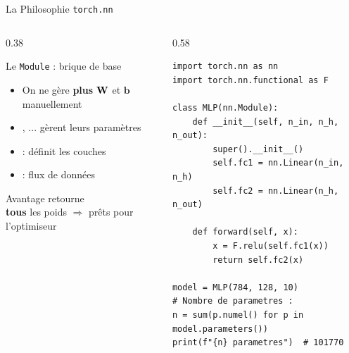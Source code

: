 \documentclass[aspectratio=169, 10pt]{beamer}
\begin{document}
\begin{frame}[fragile]{La Philosophie \texttt{torch.nn}}
  \begin{columns}[T]
    \begin{column}{0.38\textwidth}
      \begin{block}{Le \texttt{Module} : brique de base}
        \begin{itemize}\small
          \item On ne gère \textbf{plus} $\mathbf{W}$ et $\bm{b}$ manuellement
          \item {}, ... gèrent leurs paramètres
          \item {} : définit les couches
          \item {} : flux de données
        \end{itemize}
      \end{block}
      \smallskip
      \begin{exampleblock}{Avantage}
        \small{} retourne\\
        \textbf{tous} les poids $\Rightarrow$ prêts pour l'optimiseur
      \end{exampleblock}
    \end{column}
    \begin{column}{0.58\textwidth}
      \begin{lstlisting}[style=pythonstyle]
import torch.nn as nn
import torch.nn.functional as F

class MLP(nn.Module):
    def __init__(self, n_in, n_h, n_out):
        super().__init__()
        self.fc1 = nn.Linear(n_in, n_h)
        self.fc2 = nn.Linear(n_h, n_out)

    def forward(self, x):
        x = F.relu(self.fc1(x))
        return self.fc2(x)

model = MLP(784, 128, 10)
# Nombre de parametres :
n = sum(p.numel() for p in model.parameters())
print(f"{n} parametres")  # 101770
      \end{lstlisting}
    \end{column}
  \end{columns}
\end{frame}
\end{document}
